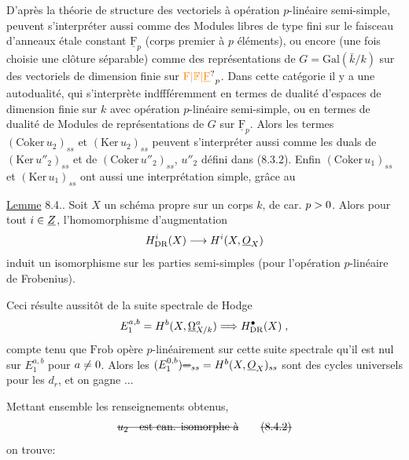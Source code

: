  D'après la théorie de structure des vectoriels à opération $p$-linéaire semi-simple,   peuvent s'interpréter aussi comme des Modules libres de type fini sur le faisceau d'anneaux étale constant $\underline{\mathrm F}_p$ (corps premier à $p$ éléments), ou encore  (une fois choisie une clôture séparable) comme des  représentations de $G=\mathrm{Gal}(\bar k/k)$ sur des vectoriels de dimension finie sur $\handwritten{\unsure{\mathrm F|\mathbb F|\underline{\mathrm F}}_p}$. Dans cette catégorie il y a une autodualité, qui s'interprète indffféremment en termes de dualité d'espaces de dimension finie sur $k$ avec opération $p$-linéaire semi-simple, ou en termes de dualité de
 Modules de représentations de $G$ sur $\underline{\mathrm F}_p$. Alors les termes $(\mathrm{Coker}\,u_2)_{ss}$ et $(\mathrm{Ker}\,u_2)_{ss}$ peuvent s'interpréter aussi comme les duals de $(\mathrm{Ker}\,u''_2)_{ss}$ et de $(\mathrm{Coker}\,u''_2)_{ss}$, $u''_2$ défini dans (8.3.2). Enfin  $(\mathrm{Coker}\,u_1)_{ss}$ et $(\mathrm{Ker}\,u_1)_{ss}$ ont aussi une interprétation simple, grâce au

\uline{Lemme} 8.4.. Soit $X$ un schéma propre sur un corps $k$, de car. $p>0$. Alors pour tout $i\in\underline Z$, l'homomorphisme d'augmentation 
\[
H^i_{\rm DR}(X)\longrightarrow H^i(X,\underline O_X)
\]
induit un isomorphisme sur les parties semi-simples (pour l'opération $p$-linéaire de Frobenius).

Ceci résulte aussitôt de la suite spectrale de Hodge
\[
E^{a,b}_1=H^b(X,\underline\Omega^a_{X/k})\Longrightarrow H^{\bullet}_{\rm DR}(X)\;,
\]
compte tenu que $\mathrm{Frob}$ opère  $p$-linéairement sur cette suite spectrale  qu'il est nul sur $E_1^{a,b}$ pour $a\ne0$. Alors les $(E_1^{0,b})\deleted{=}_{ss}=H^b(X,\underline O_X)_{ss}$ sont des cycles universels pour les $d_r$, et on gagne ...

Mettant ensemble les renseignements obtenus, 
\[
\deleted{u_2\quad\text{est can. isomorphe à}}
\tag*{\deleted{(8.4.2)}}
\]
on trouve:

